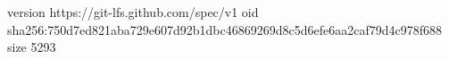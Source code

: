 version https://git-lfs.github.com/spec/v1
oid sha256:750d7ed821aba729e607d92b1dbc46869269d8c5d6efe6aa2caf79d4c978f688
size 5293
